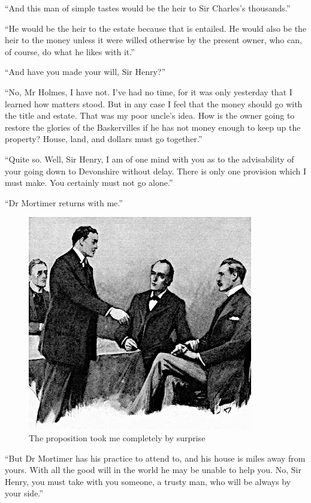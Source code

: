 \documentclass[paper=5.5in:8.5in,BCOR=7mm,twoside,DIV=calc,12pt,usegeometry,openany,chapterprefix,endperiod]{scrbook} %
\begin{document}
\enquote{And this man of simple tastes would be the heir to Sir Charles's thousands.}

\enquote{He would be the heir to the estate because that is entailed. He would also be the heir to the money unless it were willed otherwise by the present owner, who can, of course, do what he likes with it.}




\enquote{And have you made your will, Sir Henry?}

\enquote{No, Mr Holmes, I have not. I've had no time, for it was only yesterday that I learned how matters stood. But in any case I feel that the money should go with the title and estate. That was my poor uncle's idea. How is the owner going to restore the glories of the Baskervilles if he has not money enough to keep up the property? House, land, and dollars must go together.}

\enquote{Quite so. Well, Sir Henry, I am of one mind with you as to the advisability of your going down to Devonshire without delay. There is only one provision which I must make. You certainly must not go alone.}

\enquote{Dr Mortimer returns with me.}


\begin{figure}[t!h]
\centering
\includegraphics[width=.8\linewidth]{05_proposition}
\caption{The proposition took me completely by surprise}
\end{figure}

\enquote{But Dr Mortimer has his practice to attend to, and his house is miles away from yours. With all the good will in the world he may be unable to help you. No, Sir Henry, you must take with you someone, a trusty man, who will be always by your side.}
\end{document}
